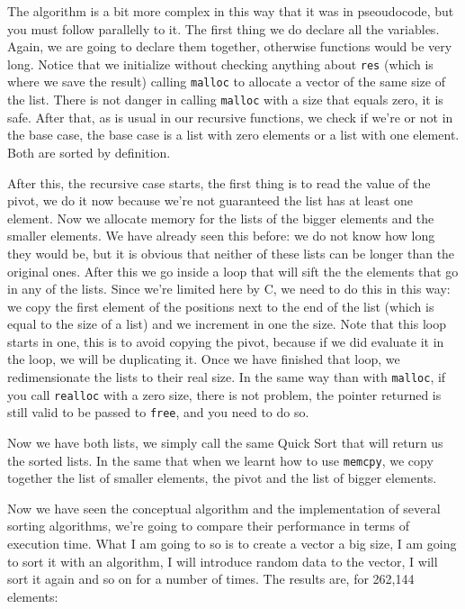 \documentclass[a4paper]{article}
\begin{document}
The algorithm is a bit more complex in this way that it was in pseoudocode, but
you must follow parallelly to it. The first thing we do declare all the
variables. Again, we are going to declare them together, otherwise functions
would be very long. Notice that we initialize without checking anything about
\texttt{res} (which is where we save the result) calling \verb!malloc! to
allocate a vector of the same size of the list. There is not danger in calling
\texttt{malloc} with a size that equals zero, it is safe. After that, as is usual
in our recursive functions, we check if we're or not in the base case, the base
case is a list with zero elements or a list with one element. Both are sorted by
definition.

After this, the recursive case starts, the first thing is to read the value of
the pivot, we do it now because we're not guaranteed the list has at least one
element. Now we allocate memory for the lists of the bigger elements and the
smaller elements. We have already seen this before: we do not know how long
they would be, but it is obvious that neither of these lists can be longer than
the original ones. After this we go inside a loop that will sift the the
elements that go in any of the lists. Since we're limited here by C, we need to
do this in this way: we copy the first element of the positions next to the end
of the list (which is equal to the size of a list) and we increment in one the
size. Note that this loop starts in one, this is to avoid copying the pivot,
because if we did evaluate it in the loop, we will be duplicating it.
Once we have finished that loop, we redimensionate the lists to their real
size. In the same way than with \verb!malloc!, if you call \verb!realloc! with a
zero size, there is not problem, the pointer returned is still valid
to be passed to \verb"free", and you need to do so.

Now we have both lists, we simply call the same Quick Sort that will return us
the sorted lists. In the same that when we learnt how to use \verb!memcpy!,
we copy together the list of smaller elements, the pivot and the list of bigger
elements.

Now we have seen the conceptual algorithm and the implementation of several
sorting algorithms, we're going to compare their performance in terms of
execution time. What I am going to so is to create a vector a big size, I am
going to sort it with an algorithm, I will introduce random data to the vector,
I will sort it again and so on for a number of times. The results are, for
262,144 elements:
\end{document}
